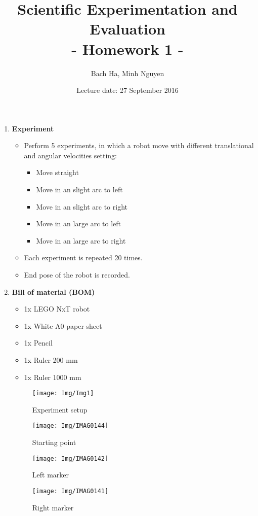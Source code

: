 \documentclass[a4paper, 12pt]{article}
\title{Scientific Experimentation and Evaluation \\
	- Homework 1 -}
\author{Bach Ha, Minh Nguyen}
\date{Lecture date: 27 September 2016}
\begin{document}
	
	\maketitle
	
	
	\begin{enumerate}
		\item \textbf{Experiment}
		\begin{itemize}
			\item Perform 5 experiments, in which a robot move with different translational and angular velocities setting:
				\begin{itemize}
					\item Move straight
					\item Move in an slight arc to left
					\item Move in an slight arc to right
					\item Move in an large arc to left
					\item Move in an large arc to right
				\end{itemize}
			\item Each experiment is repeated 20 times.
			\item End pose of the robot is recorded.
		\end{itemize}
		
		\item \textbf{Bill of material (BOM)}
		\begin{itemize}
			\item 1x LEGO NxT robot
			\item 1x White A0 paper sheet
			\item 1x Pencil
			\item 1x Ruler  200 mm
			\item 1x Ruler 1000 mm
		\end{itemize}
		
		\begin{figure}
		\centering
		\texttt{[image: Img/Img1]}
		\caption{Experiment setup}
		\label{fig:img1}
		\end{figure}
		
		\begin{figure}
			\centering
			\texttt{[image: Img/IMAG0144]}
			\caption{Starting point}
			\label{fig:img2}
		\end{figure}
		
		\begin{figure}[!tbp]
			\centering
			\begin{minipage}[b]{1\textwidth}
				\texttt{[image: Img/IMAG0142]}
				\caption{Left marker}
				\label{fig:img3}
			\end{minipage}
			\hfill
			\begin{minipage}[b]{1\textwidth}
				\texttt{[image: Img/IMAG0141]}
				\caption{Right marker}
				\label{fig:img4}
			\end{minipage}
		\end{figure}
		

\end{enumerate}
\end{document}
